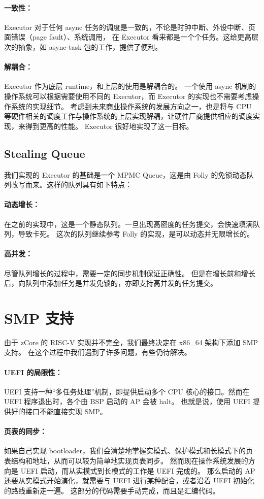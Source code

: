 \documentclass[UTF-8]{ctexart}
\begin{document}
\paragraph{一致性：}Executor 对于任何 async 任务的调度是一致的，不论是时钟中断、外设中断、页面错误（page fault）、系统调用，
在 Executor 看来都是一个个任务。这给更高层次的抽象，如 async-task 包的工作，提供了便利。
\paragraph{解耦合：}Executor 作为底层 runtime，和上层的使用是解耦合的。
一个使用 async 机制的操作系统可以根据需要使用不同的 Executor，而 Executor 的实现也不需要考虑操作系统的实现细节。
考虑到未来商业操作系统的发展方向之一，也是将与 CPU 等硬件相关的调度工作与操作系统的上层实现解耦，让硬件厂商提供相应的调度实现，来得到更高的性能。
Executor 很好地实现了这一目标。
\subsection{Stealing Queue}
我们实现的 Executor 的基础是一个 MPMC Queue，这是由 Folly 的免锁动态队列改写而来。这样的队列具有如下特点：
\paragraph{动态增长：}在之前的实现中，这是一个静态队列。一旦出现高密度的任务提交，会快速填满队列，导致卡死。
这次的队列继续参考 Folly 的实现，是可以动态并无限增长的。
\paragraph{高并发：}尽管队列增长的过程中，需要一定的同步机制保证正确性。
但是在增长前和增长后，向队列中添加任务是并发免锁的，亦即支持高并发的任务提交。

\section{SMP 支持}
由于 zCore 的 RISC-V 实现并不完全，我们最终决定在 x86\_64 架构下添加 SMP 支持。
在这个过程中我们遇到了许多问题，有些仍待解决。

\paragraph{UEFI 的局限性：}UEFI 支持一种“多任务处理”机制，即提供启动多个 CPU 核心的接口。然而在 UEFI 程序退出时，各个由 BSP 启动的 AP 会被 halt。
也就是说，使用 UEFI 提供好的接口不能直接实现 SMP。
\paragraph{页表的同步：}如果自己实现 bootloader，我们会清楚地掌握实模式、保护模式和长模式下的页表结构和地址，从而可以较为简单地实现页表同步。
然而现在操作系统发展的方向是 UEFI 启动，而从实模式到长模式的工作是 UEFI 完成的。
那么启动的 AP 还要从实模式开始演化，就需要与 UEFI 进行某种配合，或者沿着 UEFI 初始化的路线重新走一遍。
这部分的代码需要手动完成，而且是汇编代码。
\end{document}
